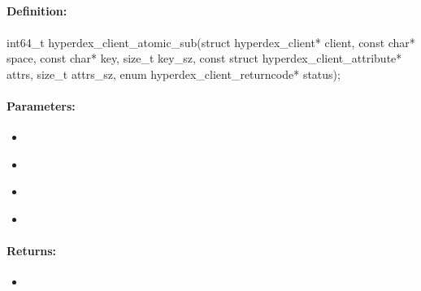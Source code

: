 \pagebreak
\subsection{}
\label{api:c:atomic_sub}


\paragraph{Definition:}
\begin{ccode}
int64_t hyperdex_client_atomic_sub(struct hyperdex_client* client,
        const char* space,
        const char* key, size_t key_sz,
        const struct hyperdex_client_attribute* attrs, size_t attrs_sz,
        enum hyperdex_client_returncode* status);
\end{ccode}

\paragraph{Parameters:}
\begin{itemize}[noitemsep]
\item {}\\

\item {}\\

\item {}\\

\item {}\\

\end{itemize}

\paragraph{Returns:}
\begin{itemize}[noitemsep]
\item {}\\

\end{itemize}

